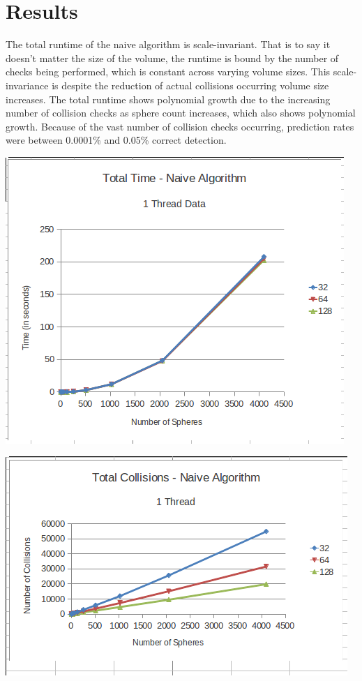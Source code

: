 \documentclass[conference]{IEEEtran}
\begin{document}
\section{Results} %

The total runtime of the naive algorithm is scale-invariant.  That is to say it doesn't matter the size of the volume, the runtime is bound by the number of checks being performed, which is constant across varying volume sizes.  This scale-invariance is despite the reduction of actual collisions occurring volume size increases.  The total runtime shows polynomial growth due to the increasing number of collision checks as sphere count increases, which also shows polynomial growth.  Because of the vast number of collision checks occurring, prediction rates were between 0.0001\% and 0.05\% correct detection.

\begin{center}
	\includegraphics[width=.45\textwidth]{runtime_naive_1thread.png}
\end{center}

\begin{center}
	\includegraphics[width=.45\textwidth]{collisions_naive_1thread.png}
\end{center}
\end{document}
